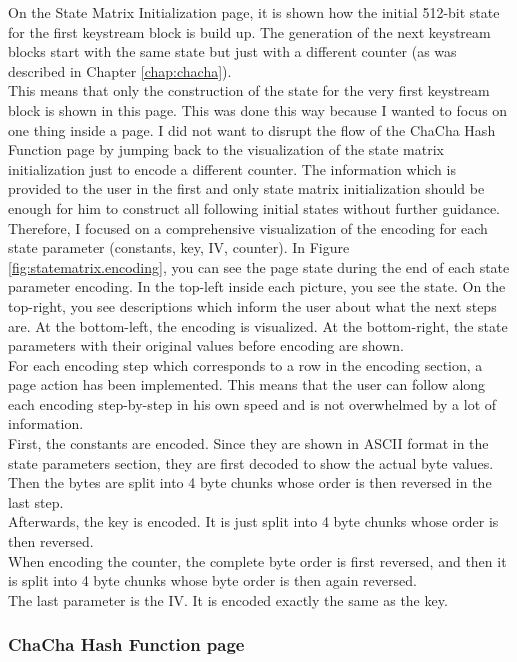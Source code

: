 On the State Matrix Initialization page, it is shown how the initial 512-bit state for the first keystream block is build up. The generation of the next keystream blocks start with the same state but just with a different counter (as was described in Chapter \ref{chap:chacha}). \\
This means that only the construction of the state for the very first keystream block is shown in this page. This was done this way because I wanted to focus on one thing inside a page. I did not want to disrupt the flow of the ChaCha Hash Function page by jumping back to the visualization of the state matrix initialization just to encode a different counter. The information which is provided to the user in the first and only state matrix initialization should be enough for him to construct all following initial states without further guidance. \\
Therefore, I focused on a comprehensive visualization of the encoding for each state parameter (constants, key, IV, counter). In Figure \ref{fig:statematrix.encoding}, you can see the page state during the end of each state parameter encoding. In the top-left inside each picture, you see the state. On the top-right, you see descriptions which inform the user about what the next steps are.
At the bottom-left, the encoding is visualized. At the bottom-right, the state parameters with their original values before encoding are shown.\\
For each encoding step which corresponds to a row in the encoding section, a page action has been implemented. This means that the user can follow along each encoding step-by-step in his own speed and is not overwhelmed by a lot of information.\\
First, the constants are encoded. Since they are shown in ASCII format in the state parameters section, they are first decoded to show the actual byte values. Then the bytes are split into 4 byte chunks whose order is then reversed in the last step. \\
Afterwards, the key is encoded. It is just split into 4 byte chunks whose order is then reversed. \\
When encoding the counter, the complete byte order is first reversed, and then it is split into 4 byte chunks whose byte order is then again reversed. \\
The last parameter is the IV. It is encoded exactly the same as the key. \\

\subsubsection{ChaCha Hash Function page}

